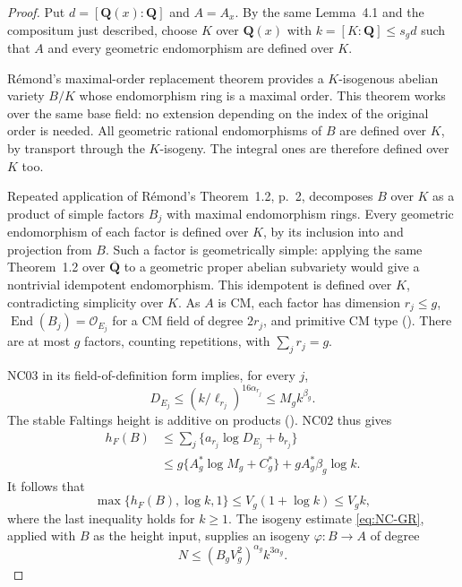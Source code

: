 \begin{proof}
Put $d=[\mathbf Q(x):\mathbf Q]$ and $A=A_x$.
By the same Lemma~4.1 and the compositum just described,
choose $K$ over $\mathbf Q(x)$ with
$k=[K:\mathbf Q]\leq s_gd$ such that $A$ and every geometric
endomorphism are defined over $K$.

R\'emond's maximal-order replacement theorem
\cite[Theorem~1.1, pp.~1--2 of the author preprint]{NC-Remond2017}
provides a $K$-isogenous abelian variety $B/K$ whose endomorphism
ring is a maximal order.  This theorem works over the same base
field: no extension depending on the index of the original order
is needed.  All geometric rational endomorphisms of $B$ are defined
over $K$, by transport through the $K$-isogeny.  The integral ones
are therefore defined over $K$ too.

Repeated application of R\'emond's Theorem~1.2, p.~2, decomposes
$B$ over $K$ as a product of simple factors $B_j$ with maximal
endomorphism rings.  Every geometric endomorphism of each factor is defined over $K$,
by its inclusion into and projection from $B$.  Such a factor is
geometrically simple: applying the same Theorem~1.2 over
$\overline{\mathbf Q}$ to a geometric proper abelian subvariety
would give a nontrivial idempotent endomorphism.  This idempotent
is defined over $K$, contradicting simplicity over $K$.
As $A$ is CM, each factor has dimension $r_j\leq g$,
$\operatorname{End}(B_j)=\mathcal O_{E_j}$ for a CM field of degree
$2r_j$, and primitive CM type (\cite[\S7, paragraph preceding Lemma~7.5,
pp.~17--18 of the preprint]{NC-Remond2017}).  There are at most $g$ factors,
counting repetitions, with $\sum_jr_j=g$.

NC03 in its field-of-definition form implies, for every $j$,
\[
 D_{E_j}\leq(k/\ell_{r_j})^{16\alpha_{r_j}}
          \leq M_g k^{\beta_g}.
\]
The stable Faltings height is additive on products
(\cite[\S2.3, p.~352]{NC-GRPeriods2014}).  NC02 thus gives
\begin{align*}
 h_F(B)&\leq\sum_j\{a_{r_j}\log D_{E_j}+b_{r_j}\}\\
 &\leq g\{A_g^*\log M_g+C_g^*\}
          +gA_g^*\beta_g\log k.
\end{align*}
It follows that
\[
 \max\{h_F(B),\log k,1\}
 \leq V_g(1+\log k)\leq V_gk,
\]
where the last inequality holds for $k\geq1$.
The isogeny estimate \eqref{eq:NC-GR}, applied with $B$ as the
height input, supplies an isogeny $\varphi:B\to A$ of degree
\begin{equation}\label{eq:NC04-degree}
 N\leq(B_gV_g^2)^{\alpha_g}k^{3\alpha_g}.
\end{equation}


\end{proof}
